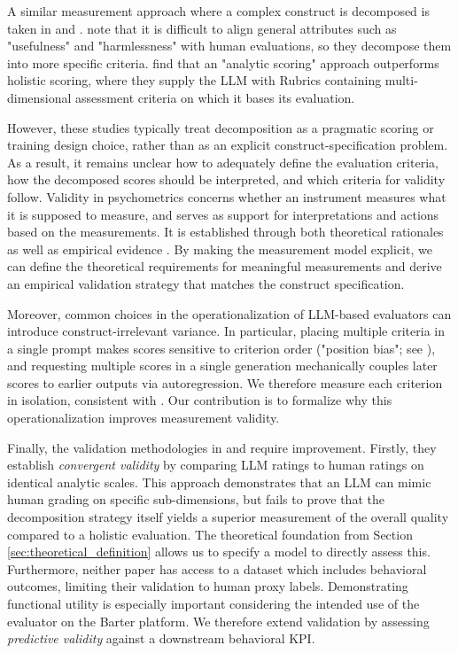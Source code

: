 A similar measurement approach where a complex construct is decomposed is taken in \citet{li-fine-grained-2026} and \citet{wang2025evaluating}. \citet{li-fine-grained-2026} note that it is difficult to align general attributes such as "usefulness" and "harmlessness" with human evaluations, so they decompose them into more specific criteria. \citet{wang2025evaluating} find that an "analytic scoring" approach outperforms holistic scoring, where they supply the LLM with Rubrics containing multi-dimensional assessment criteria on which it bases its evaluation. 

However, these studies typically treat decomposition as a pragmatic scoring or training design choice, rather than as an explicit construct-specification problem. As a result, it remains unclear how to adequately define the evaluation criteria, how the decomposed scores should be interpreted, and which criteria for validity follow. Validity in psychometrics concerns whether an instrument measures what it is supposed to measure, and serves as support for interpretations and actions based on the measurements. It is established through both theoretical rationales as well as empirical evidence \citep{messick1989meaning}. By making the measurement model explicit, we can define the theoretical requirements for meaningful measurements and derive an empirical validation strategy that matches the construct specification.  


Moreover, common choices in the operationalization of LLM-based evaluators can introduce construct-irrelevant variance. In particular, placing multiple criteria in a single prompt makes scores sensitive to criterion order ("position bias"; see \citet{shi_judging_2025}), and requesting multiple scores in a single generation mechanically couples later scores to earlier outputs via autoregression. We therefore measure each criterion in isolation, consistent with \citet{bang_transforming_2025}. Our contribution is to formalize why this operationalization improves measurement validity.

Finally, the validation methodologies in \citet{li-fine-grained-2026} and \citet{wang2025evaluating} require improvement. Firstly, they establish \textit{convergent validity} by comparing LLM ratings to human ratings on identical analytic scales. This approach demonstrates that an LLM can mimic human grading on specific sub-dimensions, but fails to prove that the decomposition strategy itself yields a superior measurement of the overall quality compared to a holistic evaluation. The theoretical foundation from Section \ref{sec:theoretical_definition} allows us to specify a model to directly assess this. Furthermore, neither paper has access to a dataset which includes behavioral outcomes, limiting their validation to human proxy labels. Demonstrating functional utility is especially important considering the intended use of the evaluator on the Barter platform. We therefore extend validation by assessing \textit{predictive validity} against a downstream behavioral KPI. 

